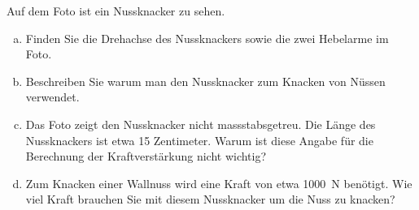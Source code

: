 
\begin{center}
\end{center}

\begin{aufgabe}
	Auf dem Foto ist ein Nussknacker zu sehen. %
	\begin{enumerate} [a)]
		\item Finden Sie die Drehachse des Nussknackers sowie die zwei Hebelarme im Foto.
		\item Beschreiben Sie warum man den Nussknacker zum Knacken von Nüssen verwendet.
		\item Das Foto zeigt den Nussknacker nicht massstabsgetreu. 
			Die Länge des Nussknackers ist etwa 15 Zentimeter. Warum ist diese Angabe für die Berechnung der Kraftverstärkung nicht wichtig?
		\item Zum Knacken einer Wallnuss wird eine Kraft von etwa \SI{1000}{N} benötigt. 
			Wie viel Kraft brauchen Sie mit diesem Nussknacker um die Nuss zu knacken?
	\end{enumerate}
\end{aufgabe}
